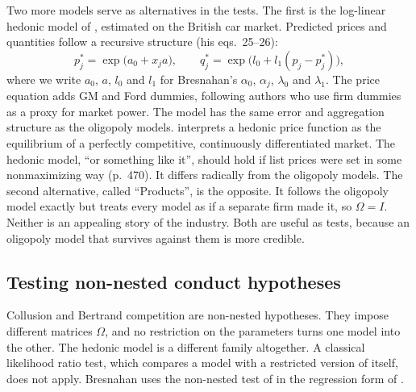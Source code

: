 Two more models serve as alternatives in the tests. The first is the log-linear hedonic model of
\citet{CowlingCubbin1971}, estimated on the British car market. Predicted prices and quantities follow a recursive
structure (his eqs.~25--26):
\begin{equation}\label{eq:06-bres-hedonic}
  p_j^* = \exp\bigl(a_0 + x_j a\bigr),
  \qquad
  q_j^* = \exp\bigl(l_0 + l_1(p_j - p_j^*)\bigr),
\end{equation}
where we write $a_0$, $a$, $l_0$ and $l_1$ for Bresnahan's $\alpha_0$, $\alpha_j$, $\lambda_0$ and $\lambda_1$. The
price equation adds GM and Ford dummies, following authors who use firm dummies as a proxy for market power. The
model has the same error and aggregation structure as the oligopoly models. \citet{Rosen1974} interprets a hedonic
price function as the equilibrium of a perfectly competitive, continuously differentiated market. The hedonic model,
``or something like it'', should hold if list prices were set in some nonmaximizing way (p.~470). It differs
radically from the oligopoly models. The second alternative, called ``Products'', is the opposite. It follows the
oligopoly model exactly but treats every model as if a separate firm made it, so $\Omega = I$. Neither is an
appealing story of the industry. Both are useful as tests, because an oligopoly model that survives against them
is more credible.

\subsection{Testing non-nested conduct hypotheses}\label{sec:06-bres-cox}

Collusion and Bertrand competition are non-nested hypotheses. They impose different matrices $\Omega$, and no
restriction on the parameters turns one model into the other. The hedonic model is a different family altogether.
A classical likelihood ratio test, which compares a model with a restricted version of itself, does not apply.
Bresnahan uses the non-nested test of \citet{Cox1961} in the regression form of \citet{PesaranDeaton1978}
\citep[p.~470]{Bresnahan1987}.

